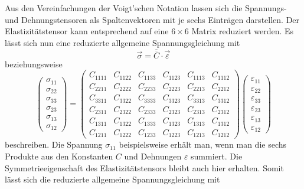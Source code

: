 Aus den Vereinfachungen der Voigt'schen Notation lassen sich die Spannungs- und Dehnungstensoren als Spaltenvektoren mit je sechs Einträgen darstellen.
Der Elastizitätstensor kann entsprechend auf eine $6\times6$ Matrix reduziert werden.
Es lässt sich nun eine reduzierte allgemeine Spannungsgleichung mit
\[
\vec{\sigma}
=
\overline{\overline{C}}\cdot\vec{\varepsilon}
\]
beziehungsweise
\[
\begin{pmatrix}
	\sigma_{11} \\
	\sigma_{22} \\
	\sigma_{33} \\
	\sigma_{23} \\
	\sigma_{13} \\
	\sigma_{12}
\end{pmatrix}
=
\begin{pmatrix}
	C_{1111} & C_{1122} & C_{1133} & C_{1123} & C_{1113} & C_{1112} \\
	C_{2211} & C_{2222} & C_{2233} & C_{2223} & C_{2213} & C_{2212} \\
	C_{3311} & C_{3322} & C_{3333} & C_{3323} & C_{3313} & C_{3312} \\
	C_{2311} & C_{2322} & C_{2333} & C_{2323} & C_{2313} & C_{2312} \\
	C_{1311} & C_{1322} & C_{1333} & C_{1323} & C_{1313} & C_{1312} \\
	C_{1211} & C_{1222} & C_{1233} & C_{1223} & C_{1213} & C_{1212}
\end{pmatrix}
\begin{pmatrix}
	\varepsilon_{11} \\
	\varepsilon_{22} \\
	\varepsilon_{33} \\
	\varepsilon_{23} \\
	\varepsilon_{13} \\
	\varepsilon_{12}
\end{pmatrix}
\]
beschreiben.
Die Spannung $\sigma_{11}$ beispielsweise erhält man, wenn man die sechs Produkte aus den Konstanten $C$ und Dehnungen $\varepsilon$ summiert.
Die Symmetrieeigenschaft des Elastizitätstensors bleibt auch hier erhalten.
Somit lässt sich die reduzierte allgemeine Spannungsgleichung mit

